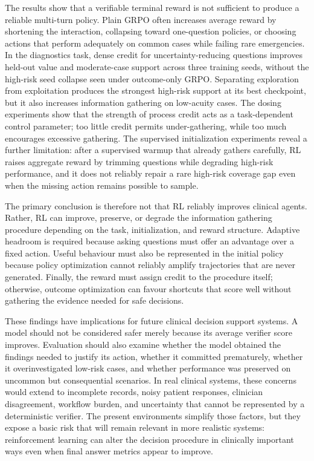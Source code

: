 \documentclass{article}
\begin{document}
The results show that a verifiable terminal reward is not sufficient to produce a
reliable multi-turn policy. Plain GRPO often increases average reward by shortening
the interaction, collapsing toward one-question policies, or choosing actions that
perform adequately on common cases while failing rare emergencies. In the
diagnostics task, dense credit for uncertainty-reducing questions improves held-out
value and moderate-case support across three training seeds, without the high-risk seed
collapse seen under outcome-only GRPO. Separating exploration from exploitation produces
the strongest high-risk support at its best checkpoint, but it also increases
information gathering on low-acuity cases. The dosing experiments show
that the strength of process credit acts as a task-dependent control parameter; too
little credit permits under-gathering, while too much encourages excessive
gathering. The supervised initialization experiments reveal a further limitation:
after a supervised warmup that already gathers carefully, RL raises aggregate reward
by trimming questions while degrading high-risk performance, and it does not reliably repair a rare high-risk coverage gap even when
the missing action remains possible to sample.

The primary conclusion is therefore not that RL reliably improves clinical agents.
Rather, RL can improve, preserve, or degrade the information gathering procedure
depending on the task, initialization, and reward structure. Adaptive headroom is
required because asking questions must offer an advantage over a fixed action.
Useful behaviour must also be represented in the initial policy because policy
optimization cannot reliably amplify trajectories that are never generated.
Finally, the reward must assign credit to the procedure itself; otherwise, outcome
optimization can favour shortcuts that score well without gathering the evidence
needed for safe decisions.

These findings have implications for future clinical decision support systems.
A model should not be considered safer merely because its average verifier score
improves. Evaluation should also examine whether the model obtained the findings
needed to justify its action, whether it committed prematurely, whether it
overinvestigated low-risk cases, and whether performance was preserved on uncommon
but consequential scenarios. In real clinical systems, these concerns would extend
to incomplete records, noisy patient responses, clinician disagreement, workflow
burden, and uncertainty that cannot be represented by a deterministic verifier.
The present environments simplify those factors, but they expose a basic risk that
will remain relevant in more realistic systems: reinforcement learning can alter the
decision procedure in clinically important ways even when final answer metrics appear
to improve.
\end{document}
